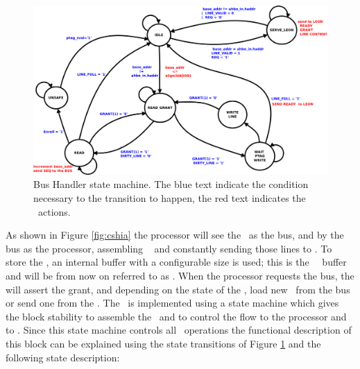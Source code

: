 \begin{figure}[!ht]
	\centering
	\includegraphics[scale=0.25]{figures/pdf/sec_hand_state_machine.pdf}
    \caption{Bus Handler state machine. The blue text indicate the condition necessary to the transition to happen, the red text indicates the \handler~actions.   }
	\label{fig:phsm}
\end{figure}

As shown in Figure \ref{fig:cshia} the processor will see the \handler~as the bus, and by the bus as the processor, assembling \slines~ and constantly sending those lines to \seceng.  To store the \slines, an internal buffer with a configurable size is used; this is the \handler~\sline~buffer and will be from now on referred to as \sbuf.  When the processor requests the bus, the \handler  will assert the grant, and depending on the state of the \sbuf, load new \slines~from the bus or send one from the \sbuf. The \handler~is implemented using a state machine which gives the block stability to assemble the \sline~and to control the flow to the processor and to \seceng. Since this state machine controls all \handler~operations the functional  description of this block can be explained using the state transitions  of Figure \ref{fig:phsm} and the following state description:

